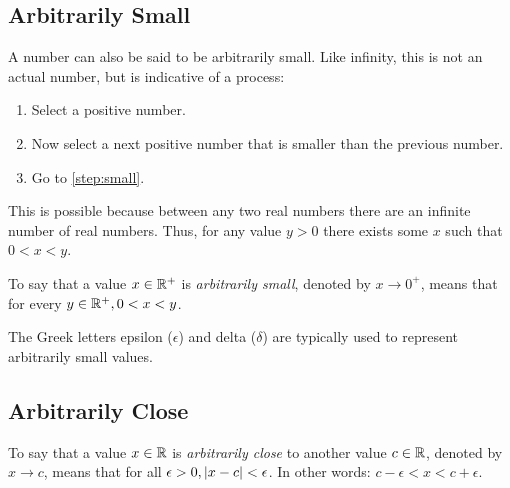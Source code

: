 \documentclass[letterpaper,12pt,fleqn]{article}
\renewcommand{\d}{\delta}
\newcommand{\e}{\epsilon}
\begin{document}
\subsection*{Arbitrarily Small}

A number can also be said to be arbitrarily small.  Like infinity, this is not an actual number, but is indicative
of a process:

\begin{enumerate}
\item Select a positive number.
\item\label{step:small} Now select a next positive number that is smaller than the previous number.
\item Go to \ref{step:small}.
\end{enumerate}

This is possible because between any two real numbers there are an infinite number of real numbers.  Thus, for any
value \(y>0\) there exists some \(x\) such that \(0<x<y\).

\bigskip

\begin{center}
\end{center}

\begin{definition}
  To say that a value \(x\in\mathbb{R}^+\) is \emph{arbitrarily small}, denoted by \(x\to0^+\), means that for every
  \(y\in\mathbb{R}^+,0<x<y\).
\end{definition}

The Greek letters epsilon (\(\e\)) and delta (\(\d\)) are typically used to represent arbitrarily small values.

\subsection*{Arbitrarily Close}

\begin{definition}
  To say that a value \(x\in\mathbb{R}\) is \emph{arbitrarily close} to another value \(c\in\mathbb{R}\), denoted by \(x\to c\),
  means that for all \(\e>0,\abs{x-c}<\e\).  In other words: \(c-\e<x<c+\e\).
\end{definition}
\end{document}
